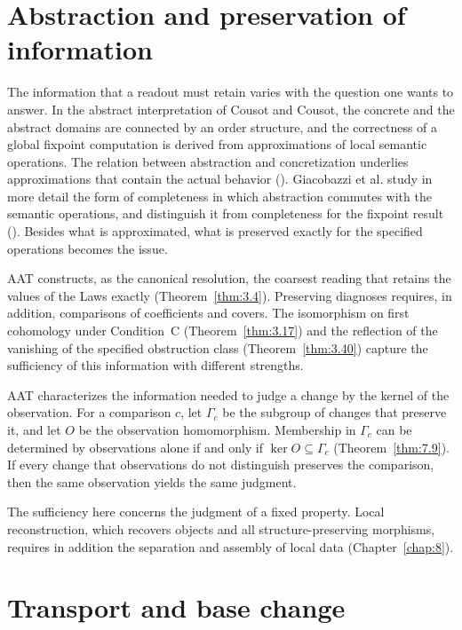 \section{Abstraction and preservation of information}\label{sec:R.3}

The information that a readout must retain varies with the question one wants to answer.
In the abstract interpretation of Cousot and Cousot, the concrete and the abstract domains are connected by an order structure, and the correctness of a global fixpoint computation is
derived from approximations of local semantic operations. The relation between abstraction
and concretization underlies approximations that contain the actual behavior
(\cite[\href{https://www.di.ens.fr/~cousot/publications.www/CousotCousot-POPL-77-ACM-p238--252-1977.pdf}{\S\S5--7, pp. 240--243}]{CC77}).
Giacobazzi et al. study in more detail the form of completeness in which abstraction
commutes with the semantic operations, and distinguish it from completeness for the fixpoint result
(\cite[\href{https://www.sci.unich.it/~scozzari/paper/JACM00.pdf}{\S3, p. 372}]{GRS00}).
Besides what is approximated, what is preserved exactly for the specified operations becomes
the issue.

AAT constructs, as the canonical resolution, the coarsest reading that retains the values of
the Laws exactly (Theorem~\ref{thm:3.4}).
Preserving diagnoses requires, in addition, comparisons of coefficients and covers.
The isomorphism on first cohomology under Condition~C (Theorem~\ref{thm:3.17}) and the
reflection of the vanishing of the specified obstruction class (Theorem~\ref{thm:3.40})
capture the sufficiency of this information with different strengths.

AAT characterizes the information needed to judge a change by the kernel of the observation.
For a comparison $c$, let $\Gamma_c$ be the subgroup of changes that preserve it, and let
$O$ be the observation homomorphism. Membership in $\Gamma_c$ can be determined by
observations alone
if and only if $\ker O\subseteq\Gamma_c$ (Theorem~\ref{thm:7.9}).
If every change that observations do not distinguish preserves the comparison, then the same
observation yields the same judgment.

The sufficiency here concerns the judgment of a fixed property.
Local reconstruction, which recovers objects and all structure-preserving morphisms,
requires in addition the separation and assembly of local data (Chapter~\ref{chap:8}).

\section{Transport and base change}\label{sec:R.4}

